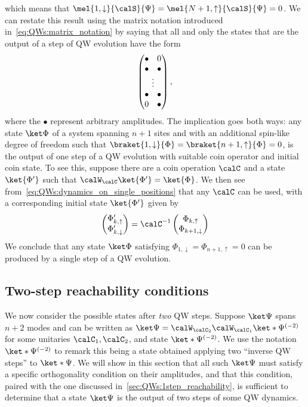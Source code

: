 which means that $\mel{1,\downarrow}{\calS}{\Psi}=\mel{N+1,\uparrow}{\calS}{\Psi}=0$.
We can restate this result using the matrix notation introduced in~\cref{eq:QWs:matrix_notation} by saying that all and only the states that are the output of a step of \ac{QW} evolution have the form
\begin{equation}
    \begin{pmatrix}
        \bullet & 0 \\
        \bullet & \bullet \\
        \multicolumn{2}{c}{\vdots} \\ 
        \bullet & \bullet \\
        0 & \bullet \\
    \end{pmatrix},
    \label{eq:QWs:matrix_notation_vanishing_endpoints}
\end{equation}
where the $\bullet$ represent arbitrary amplitudes.
The implication goes both ways: any state $\ket\Phi$ of a system spanning $n+1$ sites and with an additional spin-like degree of freedom such that
$
\braket{1, \downarrow}{\Phi} =
\braket{n+1, \uparrow}{\Phi} = 0
$,
is the output of one step of a QW evolution with suitable coin operator and initial coin state.
To see this, suppose there are a coin operation $\calC$ and a state $\ket{\Phi'}$ such that $\calW_\calC\ket{\Phi'}=\ket{\Phi}$.
We then see from~\cref{eq:QWs:dynamics_on_single_positions} that any $\calC$ can be used, with a corresponding initial state $\ket{\Phi'}$ given by
\begin{equation}
    \begin{pmatrix}
        \Phi'_{k,\uparrow} \\
        \Phi'_{k,\downarrow}
    \end{pmatrix} = \calC^{-1}
    \begin{pmatrix}
        \Phi_{k,\uparrow} \\
        \Phi_{k+1,\downarrow}
    \end{pmatrix}
\end{equation}
We conclude that any state $\ket\Phi$ satisfying $\Phi_{1,\downarrow}=\Phi_{n+1,\uparrow}=0$ can be produced by a single step of a QW evolution.

\subsection{Two-step reachability conditions}
\label{sec:QWs:2step_reachability}
We now consider the possible states after \textit{two} \ac{QW} steps.
Suppose $\ket\Psi$ spans $n+2$ modes and can be written as
$\ket\Psi=\calW_{\calC_2}\calW_{\calC_1}\ket*{\Psi^{(-2)}}$
for some unitaries $\calC_1,\calC_2$, and state $\ket*{\Psi^{(-2)}}$. We use the notation $\ket*{\Psi^{(-2)}}$ to remark this being a state obtained applying two ``inverse QW steps'' to $\ket*\Psi$.
We will show in this section that all such $\ket\Psi$ must satisfy a specific orthogonality condition on their amplitudes, and that this condition, paired with the one discussed in~\cref{sec:QWs:1step_reachability}, is sufficient to determine that a state $\ket\Psi$ is the output of two steps of some \ac{QW} dynamics.

